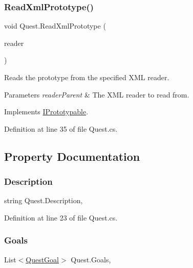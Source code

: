 \subsubsection{\texorpdfstring{Read\+Xml\+Prototype()}{ReadXmlPrototype()}}
{\footnotesize\ttfamily void Quest.\+Read\+Xml\+Prototype (\begin{DoxyParamCaption}\item[{Xml\+Reader}]{reader }\end{DoxyParamCaption})}



Reads the prototype from the specified X\+ML reader. 


\begin{DoxyParams}{Parameters}
{\em reader\+Parent} & The X\+ML reader to read from.\\
\hline
\end{DoxyParams}


Implements \hyperlink{interface_i_prototypable_a024d752c4be655a7166db5718f1fad6a}{I\+Prototypable}.



Definition at line 35 of file Quest.\+cs.



\subsection{Property Documentation}
\mbox{\label{class_quest_afb8483a073d09ccc09ea668014a91f7a}} 
\subsubsection{\texorpdfstring{Description}{Description}}
{\footnotesize\ttfamily string Quest.\+Description\hspace{0.3cm}{\ttfamily [get]}, {\ttfamily [set]}}



Definition at line 23 of file Quest.\+cs.

\mbox{\label{class_quest_a404f8c405e51a0b892b9b93f785a7bcf}} 
\subsubsection{\texorpdfstring{Goals}{Goals}}
{\footnotesize\ttfamily List$<$\hyperlink{class_quest_goal}{Quest\+Goal}$>$ Quest.\+Goals\hspace{0.3cm}{\ttfamily [get]}, {\ttfamily [set]}}



